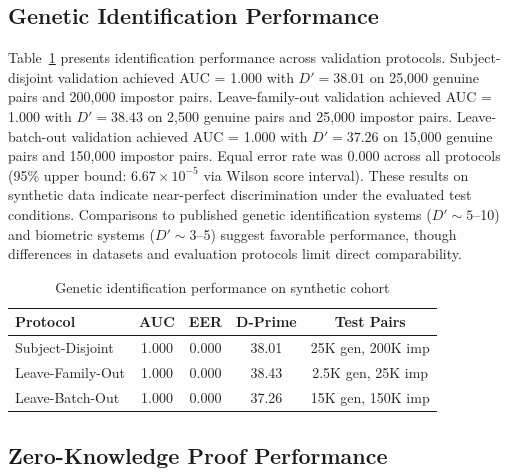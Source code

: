 \documentclass[11pt,letterpaper]{article}
\begin{document}
\subsection{Genetic Identification Performance}

Table~\ref{tab:identification} presents identification performance across validation protocols. Subject-disjoint validation achieved AUC = 1.000 with $D' = 38.01$ on 25,000 genuine pairs and 200,000 impostor pairs. Leave-family-out validation achieved AUC = 1.000 with $D' = 38.43$ on 2,500 genuine pairs and 25,000 impostor pairs. Leave-batch-out validation achieved AUC = 1.000 with $D' = 37.26$ on 15,000 genuine pairs and 150,000 impostor pairs. Equal error rate was 0.000 across all protocols (95\% upper bound: $6.67 \times 10^{-5}$ via Wilson score interval). These results on synthetic data indicate near-perfect discrimination under the evaluated test conditions. Comparisons to published genetic identification systems ($D' \sim 5$--10) and biometric systems ($D' \sim 3$--5) suggest favorable performance, though differences in datasets and evaluation protocols limit direct comparability.

\begin{table}[!ht]
\centering
\caption{Genetic identification performance on synthetic cohort}
\label{tab:identification}
\begin{tabular}{lcccc}
\toprule
\textbf{Protocol} & \textbf{AUC} & \textbf{EER} & \textbf{D-Prime} & \textbf{Test Pairs} \\
\midrule
Subject-Disjoint & 1.000 & 0.000 & 38.01 & 25K gen, 200K imp \\
Leave-Family-Out & 1.000 & 0.000 & 38.43 & 2.5K gen, 25K imp \\
Leave-Batch-Out & 1.000 & 0.000 & 37.26 & 15K gen, 150K imp \\
\bottomrule
\end{tabular}
\end{table}

\subsection{Zero-Knowledge Proof Performance}
\end{document}
